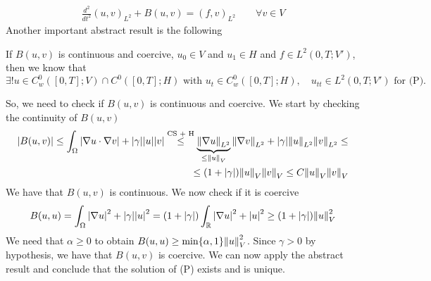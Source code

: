 \[
    \begin{split}
        \frac{d^2}{dt^2} (u, v)_{L^2} + B(u, v) = (f, v)_{L^2} \qquad \forall v \in V
    \end{split}
\]
Another important abstract result is the following
\begin{remark}
    If \(B(u, v)\) is continuous and coercive, \(u_0 \in V\) and \(u_1 \in H\) and \(f \in L^2(0, T; V')\), then we know that 
    \[
        \exists! u \in C_w^0([0, T]; V) \cap C^0([0, T]; H) \text{ with } u_t \in C_w^0([0, T]; H), \quad u_{tt} \in L^2(0, T; V') \text{ for (P).}
    \]
\end{remark}
So, we need to check if \(B(u, v)\) is continuous and coercive. We start by checking the continuity of \(B(u, v)\)
\[
    \begin{split}
        \abs{B(u, v)} \leq \int_\Omega \abs{\nabla u \cdot \nabla v} + \abs{\gamma} \abs{u} \abs{v} \overset{\text{CS + H}}{\leq} \underbrace{\norm{\nabla u}_{L^2}}_{\leq \norm{u}_V} \norm{\nabla v}_{L^2} + \abs{\gamma} \norm{u}_{L^2} \norm{v}_{L^2} \leq \\ 
        \leq (1 + \abs{\gamma}) \norm{u}_V \norm{v}_V \leq C \norm{u}_V \norm{v}_V
    \end{split}
\]
We have that \(B(u, v)\) is continuous. We now check if it is coercive
\[
    \begin{split}
        B(u, u) = \int_\Omega \abs{\nabla u}^2 + \abs{\gamma} \abs{u}^2 = (1 + \abs{\gamma}) \int_{\mathbb{R}} \abs{\nabla u}^2  + \abs{u}^2 \geq (1 + \abs{\gamma}) \norm{u}_V^2
    \end{split}
\]
We need that \(\alpha \geq 0\) to obtain \(B(u,u) \geq \min\{\alpha, 1\} \norm{u}_V^2\). Since \(\gamma > 0\) by hypothesis, we have that \(B(u, v)\) is coercive. We can now apply the abstract result and conclude that the solution of (P) exists and is unique.

